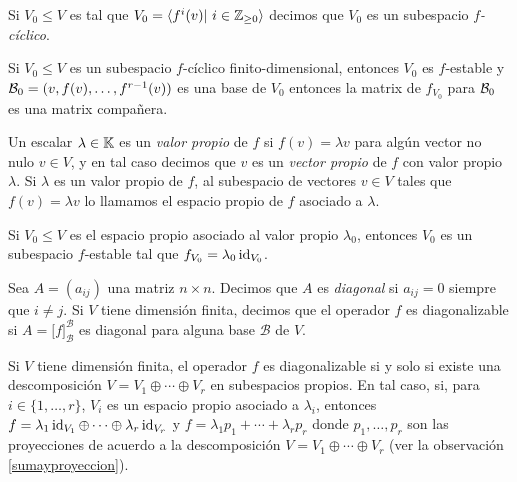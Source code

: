 \begin{defn}
  Si $V_0\le V$ es tal que $V_0=\langle f^i(v)|\ i\in\mathbb{Z}_{\ge 0} \rangle$ decimos que $V_0$ es un subespacio \emph{$f$-cíclico}. 
\end{defn}

\begin{obs}
  Si $V_0\le V$ es un subespacio $f$-cíclico finito-dimensional, entonces $V_0$ es $f$-estable y $\mathcal{B}_0=(v,f(v),\ldots,f^{r-1}(v))$ es una base de $V_0$ entonces la matrix de $f_{V_0}$ para $\mathcal{B}_0$ es una matrix compañera.
\end{obs}

\begin{defn}
  Un escalar $\lambda\in\mathbb{K}$ es un \emph{valor propio} de $f$ si $f(v)=\lambda v$ para algún vector no nulo $v\in V$, y en tal caso decimos que $v$ es un \emph{vector propio} de $f$ con valor propio $\lambda$. Si $\lambda$ es un valor propio de $f$, al subespacio de vectores $v\in V$ tales que $f(v)=\lambda v$ lo llamamos el espacio propio de $f$ asociado a $\lambda$.
\end{defn}

\begin{obs}
  Si $V_0\le V$ es el espacio propio asociado al valor propio $\lambda_0$, entonces $V_0$ es un subespacio $f$-estable tal que $f_{V_0}=\lambda_0\operatorname{id}_{V_0}$.
\end{obs}

\begin{defn}
Sea $A=(a_{ij})$ una matriz $n\times n$. Decimos que $A$ es \emph{diagonal} si $a_{ij}=0$ siempre que $i\ne j$. Si $V$ tiene dimensión finita, decimos que el operador $f$ es diagonalizable si $A=\Big[f\Big]^{\mathcal{B}}_{\mathcal{B}}$ es diagonal para alguna base $\mathcal{B}$ de $V$.
\end{defn}

\begin{teo}\label{diagosiysolosi}
Si $V$ tiene dimensión finita, el operador $f$ es diagonalizable si y solo si existe una descomposición $V=V_1\oplus\cdots\oplus V_r$ en subespacios propios. En tal caso, si, para $i\in\{1,\ldots,r\}$, $V_i$ es un espacio propio asociado a $\lambda_i$, entonces $f=\lambda_1\operatorname{id}_{V_1}\oplus\cdots\oplus\lambda_r\operatorname{id}_{V_r}$ y $f=\lambda_1p_1+\cdots+\lambda_rp_r$ donde $p_1,\ldots,p_r$ son las proyecciones de acuerdo a la descomposición $V=V_1\oplus\cdots\oplus V_r$ (ver la observación \ref{sumayproyeccion}).
\end{teo}


